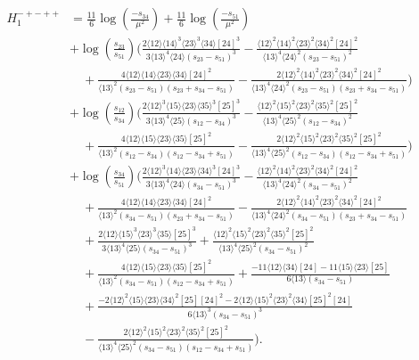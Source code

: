 \documentclass[11pt]{article}
\newcommand{\nn}{\nonumber}
\newcommand{\la}{\langle}
\newcommand{\ra}{\rangle}
\begin{document}
\begin{align}
	H_1^{-+-++} &= 
	\frac{11}{6} \log \left(\frac{-s_{34}}{\mu^2}\right)
	+ \frac{11}{6} \log \left(\frac{-s_{51}}{\mu^2}\right)
	\nn\\&
	+ \log\left(\frac{s_{23}}{s_{51}}\right) 
	\bigg(
		\frac{2 \la12\ra \la14\ra^3 \la23\ra^3 \la34\ra [24]^3}{3 \la13\ra^4 \la24\ra (s_{23}-s_{51})^3}
		-\frac{\la12\ra^2 \la14\ra^2 \la23\ra^2 \la34\ra^2 [24]^2}{\la13\ra^4 \la24\ra^2 (s_{23}-s_{51})^2}
		\nn\\&\quad
		+\frac{4 \la12\ra \la14\ra \la23\ra \la34\ra [24]^2}{\la13\ra^2 (s_{23}-s_{51}) (s_{23}+s_{34}-s_{51})}
		-\frac{2 \la12\ra^2 \la14\ra^2 \la23\ra^2 \la34\ra^2 [24]^2}{\la13\ra^4 \la24\ra^2 (s_{23}-s_{51}) (s_{23}+s_{34}-s_{51})}
	\bigg) 
	\nn\\&
	+ \log\left(\frac{s_{12}}{s_{34}}\right) 
	\bigg(
		\frac{2 \la12\ra^3 \la15\ra \la23\ra \la35\ra^3 [25]^3}{3 \la13\ra^4 \la25\ra (s_{12}-s_{34})^3}
		-\frac{\la12\ra^2 \la15\ra^2 \la23\ra^2 \la35\ra^2 [25]^2}{\la13\ra^4 \la25\ra^2 (s_{12}-s_{34})^2}
		\nn\\&\quad
		+\frac{4 \la12\ra \la15\ra \la23\ra \la35\ra [25]^2}{\la13\ra^2 (s_{12}-s_{34}) (s_{12}-s_{34}+s_{51})}
		-\frac{2 \la12\ra^2 \la15\ra^2 \la23\ra^2 \la35\ra^2 [25]^2}{\la13\ra^4 \la25\ra^2 (s_{12}-s_{34}) (s_{12}-s_{34}+s_{51})}	
	\bigg) 
	\nn\\&
	+ \log\left(\frac{s_{34}}{s_{51}}\right) 
	\bigg(
		\frac{2 \la12\ra^3 \la14\ra \la23\ra \la34\ra^3 [24]^3}{3 \la13\ra^4 \la24\ra (s_{34}-s_{51})^3}
		-\frac{\la12\ra^2 \la14\ra^2 \la23\ra^2 \la34\ra^2 [24]^2}{\la13\ra^4 \la24\ra^2 (s_{34}-s_{51})^2}
		\nn\\&\quad
		+\frac{4 \la12\ra \la14\ra \la23\ra \la34\ra [24]^2}{\la13\ra^2 (s_{34}-s_{51}) (s_{23}+s_{34}-s_{51})}
		-\frac{2 \la12\ra^2 \la14\ra^2 \la23\ra^2 \la34\ra^2 [24]^2}{\la13\ra^4 \la24\ra^2 (s_{34}-s_{51}) (s_{23}+s_{34}-s_{51})}
		\nn\\&\quad
		+\frac{2 \la12\ra \la15\ra^3 \la23\ra^3 \la35\ra [25]^3}{3 \la13\ra^4 \la25\ra (s_{34}-s_{51})^3}
		+\frac{\la12\ra^2 \la15\ra^2 \la23\ra^2 \la35\ra^2 [25]^2}{\la13\ra^4 \la25\ra^2 (s_{34}-s_{51})^2}
		\nn\\&\quad
		+\frac{4 \la12\ra \la15\ra \la23\ra \la35\ra [25]^2}{\la13\ra^2 (s_{34}-s_{51}) (s_{12}-s_{34}+s_{51})}
		+\frac{-11 \la12\ra \la34\ra [24]-11 \la15\ra \la23\ra [25]}{6 \la13\ra (s_{34}-s_{51})}
		\nn\\&\quad
		+\frac{-2 \la12\ra^2 \la15\ra \la23\ra \la34\ra^2 [25] [24]^2-2 \la12\ra \la15\ra^2 \la23\ra^2 \la34\ra [25]^2 [24]}{6 \la13\ra^3 (s_{34}-s_{51})^3}
		\nn\\&\quad
		-\frac{2 \la12\ra^2 \la15\ra^2 \la23\ra^2 \la35\ra^2 [25]^2}{\la13\ra^4 \la25\ra^2 (s_{34}-s_{51}) (s_{12}-s_{34}+s_{51})}
	\bigg) .
\end{align}
\end{document}
